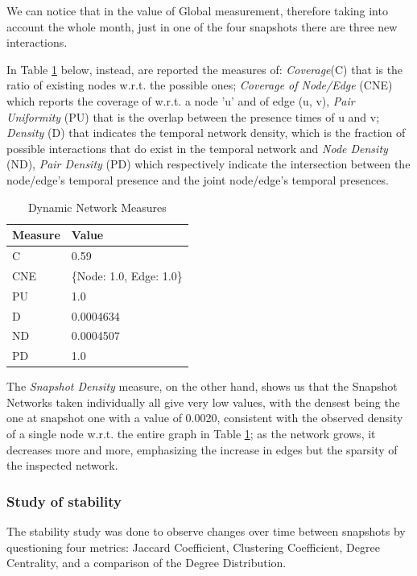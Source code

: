 \documentclass[sigchi]{acmart}
\begin{document}
We can notice that in the value of Global measurement, therefore taking into account the whole month, just in one of the four snapshots there are three new interactions.

In Table \ref{tab:Dynamic Network Measures} below, instead, are reported the measures of: \textit{Coverage}(C) that is the ratio of existing nodes w.r.t. the possible ones; \textit{Coverage of Node/Edge} (CNE) which reports the coverage of w.r.t. a node ’u’ and of edge (u, v), \textit{Pair Uniformity} (PU) that is the overlap between the presence times of u and v; \textit{Density} (D) that indicates the temporal network density, which is the fraction of possible interactions that do exist in the temporal network and \textit{Node Density} (ND), \textit{Pair Density} (PD) which respectively indicate the intersection between the node/edge’s temporal presence and the joint node/edge’s temporal presences.

\begin{table}[H]
\centering
\begin{tabular}{|p{3cm}|p{3cm}|}
\hline
\textbf{Measure} & \textbf{Value} \\ \hline
C & 0.59 \\ \hline
CNE & \{Node: 1.0, Edge: 1.0\} \\ \hline
PU & 1.0 \\ \hline
D & 0.0004634 \\ \hline
ND & 0.0004507 \\ \hline
PD & 1.0 \\ \hline
\end{tabular}
\caption{Dynamic Network Measures}
\label{tab:Dynamic Network Measures}
\end{table}

The \textit{Snapshot Density} measure, on the other hand, shows us that the Snapshot Networks taken individually all give very low values, with the densest being the one at snapshot one with a value of 0.0020, consistent with the observed density of a single node w.r.t. the entire graph in Table \ref{tab:Dynamic Network Measures}; as the network grows, it decreases more and more, emphasizing the increase in edges but the sparsity of the inspected network.

\subsubsection{Study of stability}
The stability study was done to observe changes over time between snapshots by questioning four metrics: Jaccard Coefficient, Clustering Coefficient, Degree Centrality, and a comparison of the Degree Distribution.
\end{document}
